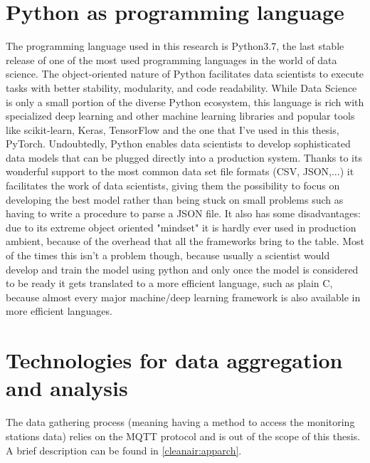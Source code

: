 \documentclass[11pt,a4paper,titlepage]{book}
\begin{document}
\section{Python as programming language}
The programming language used in this research is Python3.7, the last stable release of one of the most used programming languages in the world of data science.
\newline
\newline
The object-oriented nature of Python facilitates data scientists to execute tasks with better stability, modularity, and code readability. While Data Science is only a small portion of the diverse Python ecosystem, this language is rich with specialized deep learning and other machine learning libraries and popular tools like scikit-learn, Keras, TensorFlow and the one that I've used in this thesis, PyTorch. Undoubtedly, Python enables data scientists to develop sophisticated data models that can be plugged directly into a production system.
\newline
\newline
Thanks to its wonderful support to the most common data set file formats (CSV, JSON,...) it facilitates the work of data scientists, giving them the possibility to focus on developing the best model rather than being stuck on small problems such as having to write a procedure to parse a JSON file.
\newline
\newline
It also has some disadvantages: due to its extreme object oriented "mindset" it is hardly ever used in production ambient, because of the overhead that all the frameworks bring to the table. Most of the times this isn't a problem though, because usually a scientist would develop and train the model using python and only once the model is considered to be ready it gets translated to a more efficient language, such as plain C, because almost every major machine/deep learning framework is also available in more efficient languages.

\section{Technologies for data aggregation and analysis}
The data gathering process (meaning having a method to access the monitoring stations data) relies on the MQTT protocol and is out of the scope of this thesis. A brief description can be found in \ref{cleanair:apparch}.
\end{document}
